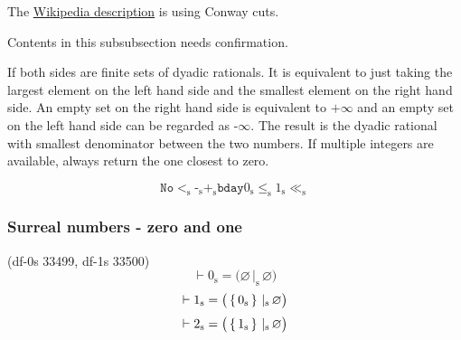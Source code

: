 \documentclass[12pt, letterpaper]{article}
\newcommand{\red}[1]{{\color{red} #1}}
\renewcommand{\emptyset}{\varnothing}
\newcommand{\provable}{\vdash}
\newcommand{\pnf}{\texttt{+}\infty}
\newcommand{\mnf}{\texttt{-}\infty}
\newcommand{\No}{\texttt{No}}
\newcommand{\bday}{\texttt{bday}}
\newcommand{\sur}[1]{{#1}_{\operatorname{s}}}
\newcommand{\slt}{\sur{<}}
\newcommand{\sle}{\sur{\le}}
\newcommand{\sslt}{\sur{\ll}}
\newcommand{\sneg}{\sur{\texttt{-}}}
\newcommand{\spos}{\sur{\texttt{+}}}
\newcommand{\scut}{\,\sur{|}\,}
\theoremstyle{definition}
\theoremstyle{remark}
\theoremstyle{definition}
\theoremstyle{plain}
\begin{document}
	The \href{https://en.wikipedia.org/wiki/Surreal_number#Description}{Wikipedia description} is using Conway cuts.
	
	\red{Contents in this subsubsection needs confirmation.}
	
	If both sides are finite sets of dyadic rationals. It is equivalent to just taking the largest element on the left hand side and the smallest element on the right hand side. An empty set on the right hand side is equivalent to $\pnf$ and an empty set on the left hand side can be regarded as $\mnf$.
	The result is the dyadic rational with smallest denominator between the two numbers. If multiple integers are available, always return the one closest to zero.
	
	\[\No 
	\slt \sneg \spos  \bday \sur{0}\sle\sur{1} \sslt \]
	
	\subsubsection{Surreal numbers - zero and one}
	(df-0s 33499, df-1s 33500)
	\[\provable\sur{0}=\big(\emptyset\scut\emptyset\big)\]
	\[\provable\sur{1}=\big(\set{\sur{0}}\scut\emptyset\big)\]
	\[\provable\sur{2}=\big(\set{\sur{1}}\scut\emptyset\big)\]
\end{document}
